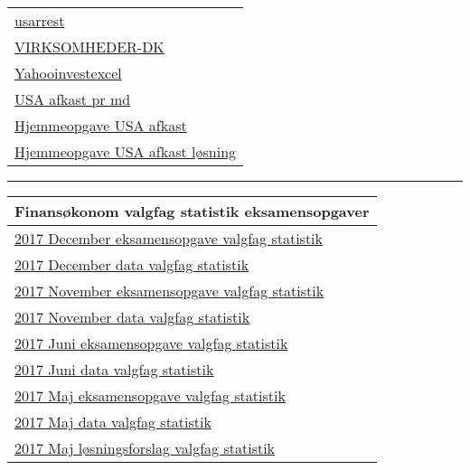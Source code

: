 \documentclass[]{book}
\begin{document}
\begin{longtable}[]{@{}l@{}}
\href{https://drive.google.com/uc?export=download\&id=0B1E7VnhxsDMlRDhUYUk4R0NwVFk}{usarrest}\tabularnewline
\href{https://drive.google.com/uc?export=download\&id=0B1E7VnhxsDMlVmxHTDltNk1VSG8}{VIRKSOMHEDER-DK}\tabularnewline
\href{https://drive.google.com/uc?export=download\&id=0B1E7VnhxsDMlYnFpbWp1YTBlLVE}{Yahooinvestexcel}\tabularnewline
\href{https://drive.google.com/uc?export=download\&id=0B1E7VnhxsDMldVZtS2tzV0RqVjQ}{USA
afkast pr md}\tabularnewline
\href{https://drive.google.com/uc?export=download\&id=0B1E7VnhxsDMlekM5eVRYZkdUZnc}{Hjemmeopgave
USA afkast}\tabularnewline
\href{https://drive.google.com/uc?export=download\&id=0B1E7VnhxsDMlSDNPZi1zSTlqNk0}{Hjemmeopgave
USA afkast løsning}\tabularnewline
\bottomrule
\end{longtable}

\begin{center}\rule{0.5\linewidth}{\linethickness}\end{center}

\begin{longtable}[]{@{}l@{}}
\toprule
Finansøkonom valgfag statistik eksamensopgaver\tabularnewline
\midrule
\endhead
\href{https://www.dropbox.com/s/lpiglled5qdmtjh/2017\%20December\%20eksamensopgave\%20valgfag\%20statistik.pdf?dl=1}{2017
December eksamensopgave valgfag statistik}\tabularnewline
\href{https://www.dropbox.com/s/ki9mpbsn8jak84i/2017\%20December\%20-\%20Data.xlsx?dl=1}{2017
December data valgfag statistik}\tabularnewline
\href{https://www.dropbox.com/s/3wwbnvyxdz5z04h/2017\%20November\%20eksamensopgave\%20valgfag\%20statistik.pdf?dl=1}{2017
November eksamensopgave valgfag statistik}\tabularnewline
\href{https://www.dropbox.com/s/nqqyc5puaqjuoo7/2017\%20November\%20valgfag\%20statistik\%20-\%20Erstatninger.xlsx?dl=1}{2017
November data valgfag statistik}\tabularnewline
\href{https://www.dropbox.com/s/hc44wglho5tccgs/2017\%20Juni\%20eksamensopgave\%20valgfag\%20statistik.pdf?dl=1}{2017
Juni eksamensopgave valgfag statistik}\tabularnewline
\href{https://www.dropbox.com/s/73azkke4vnduzbk/2017\%20Juni\%20Data\%20-\%20Billeasing.xlsx?dl=1}{2017
Juni data valgfag statistik}\tabularnewline
\href{https://www.dropbox.com/s/psnsb67bw4v98a7/2017\%20Maj\%20eksamensopgave\%20valgfag\%20statistk.pdf?dl=1}{2017
Maj eksamensopgave valgfag statistik}\tabularnewline
\href{https://www.dropbox.com/s/7wpcnkdrjs9tetl/2017\%20Maj\%20Bank.xlsx?dl=1}{2017
Maj data valgfag statistik}\tabularnewline
\href{https://www.dropbox.com/s/4z84mj0mvx4xrql/2017\%20Maj\%20Valgfag\%2C\%20statistik\%20-\%20l\%C3\%B8sning.docx?dl=1}{2017
Maj løsningsforslag valgfag statistik}\tabularnewline
\bottomrule
\end{longtable}
\end{document}
